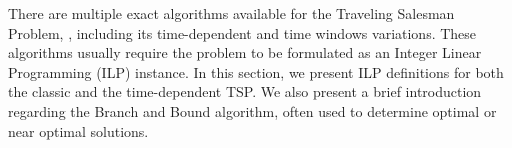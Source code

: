 There are multiple exact algorithms available for the Traveling Salesman Problem, \cite{tsp_exact_review}, including its time-dependent \cite{tdtwptw_exact} and time windows \cite{tsptw_exact_soloman} variations. These algorithms usually require the problem to be formulated as an Integer Linear Programming (ILP) instance. In this section, we present ILP definitions for both the classic and the time-dependent TSP. We also present a brief introduction regarding the Branch and Bound algorithm, often used to determine optimal or near optimal solutions.



